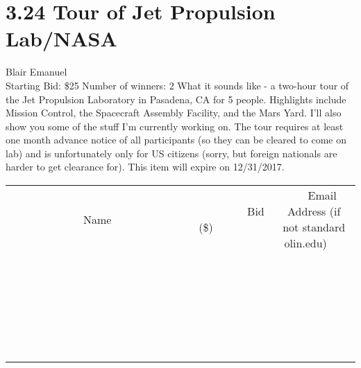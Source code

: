 \documentclass[11pt]{article}
\begin{document}
\section*{3.24 Tour of Jet Propulsion Lab/NASA}
Blair Emanuel
\\
Starting Bid: \$25
\newline
Number of winners: 2
\newline
What it sounds like - a two-hour tour of the Jet Propulsion Laboratory in Pasadena, CA for 5 people. Highlights include Mission Control, the Spacecraft Assembly Facility, and the Mars Yard. I'll also show you some of the stuff I'm currently working on. The tour requires at least one month advance notice of all participants (so they can be cleared to come on lab) and is unfortunately only for US citizens (sorry, but foreign nationals are harder to get clearance for). This item will expire on 12/31/2017.
\\[6ex]
\begin{tabular}{c c c}
~~~~~~~~~~~~~Name~~~~~~~~~~~~~ & ~~~~~~~~~Bid (\$)~~~~~~~~~  & ~~~Email Address (if not standard olin.edu)~~~\\
 & & \\
\hline
 & & \\
\hline
 & & \\
\hline
 & & \\
\hline
 & & \\
\hline
 & & \\
\hline
 & & \\
\hline
 & & \\
\hline
 & & \\
\hline
 & & \\
\hline
 & & \\
\hline
 & & \\
\hline
 & & \\
\hline
 & & \\
\hline
 & & \\
\hline
 & & \\
\hline
 & & \\
\hline
 & & \\
\hline
 & & \\
\hline
 & & \\
\hline
 & & \\
\hline
 & & \\
\hline
 & & \\
\hline
 & & \\
\hline
 & & \\
\hline
 & & \\
\hline
\end{tabular}
\newpage
\end{document}
